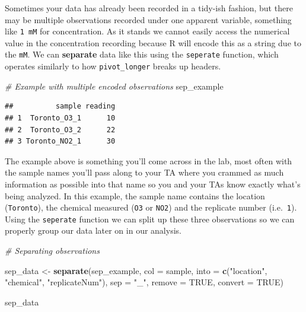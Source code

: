 \documentclass[
]{book}
\newenvironment{Shaded}{\begin{snugshade}}{\end{snugshade}}
\newcommand{\AttributeTok}[1]{\textcolor[rgb]{0.13,0.29,0.53}{#1}}
\newcommand{\CommentTok}[1]{\textcolor[rgb]{0.56,0.35,0.01}{\textit{#1}}}
\newcommand{\ConstantTok}[1]{\textcolor[rgb]{0.56,0.35,0.01}{#1}}
\newcommand{\FunctionTok}[1]{\textcolor[rgb]{0.13,0.29,0.53}{\textbf{#1}}}
\newcommand{\NormalTok}[1]{#1}
\newcommand{\OtherTok}[1]{\textcolor[rgb]{0.56,0.35,0.01}{#1}}
\newcommand{\StringTok}[1]{\textcolor[rgb]{0.31,0.60,0.02}{#1}}
\begin{document}
Sometimes your data has already been recorded in a tidy-ish fashion, but there may be multiple observations recorded under one apparent variable, something like \texttt{1\ mM} for concentration. As it stands we cannot easily access the numerical value in the concentration recording because R will encode this as a string due to the \texttt{mM}. We can \textbf{separate} data like this using the \texttt{seperate} function, which operates similarly to how \texttt{pivot\_longer} breaks up headers.

\begin{Shaded}
\begin{Highlighting}[]
\CommentTok{\# Example with multiple encoded observations}
\NormalTok{sep\_example}
\end{Highlighting}
\end{Shaded}

\begin{verbatim}
##          sample reading
## 1  Toronto_O3_1      10
## 2  Toronto_O3_2      22
## 3 Toronto_NO2_1      30
\end{verbatim}

The example above is something you'll come across in the lab, most often with the sample names you'll pass along to your TA where you crammed as much information as possible into that name so you and your TAs know exactly what's being analyzed. In this example, the sample name contains the location (\texttt{Toronto}), the chemical measured (\texttt{O3} or \texttt{NO2}) and the replicate number (i.e.~\texttt{1}). Using the \texttt{seperate} function we can split up these three observations so we can properly group our data later on in our analysis.

\begin{Shaded}
\begin{Highlighting}[]
\CommentTok{\# Separating observations}

\NormalTok{sep\_data }\OtherTok{\textless{}{-}} \FunctionTok{separate}\NormalTok{(sep\_example,}
    \AttributeTok{col =}\NormalTok{ sample, }
    \AttributeTok{into =} \FunctionTok{c}\NormalTok{(}\StringTok{"location"}\NormalTok{, }\StringTok{"chemical"}\NormalTok{, }\StringTok{"replicateNum"}\NormalTok{),}
    \AttributeTok{sep =} \StringTok{"\_"}\NormalTok{,}
    \AttributeTok{remove =} \ConstantTok{TRUE}\NormalTok{, }
    \AttributeTok{convert =} \ConstantTok{TRUE}\NormalTok{)}

\NormalTok{sep\_data}
\end{Highlighting}
\end{Shaded}
\end{document}
